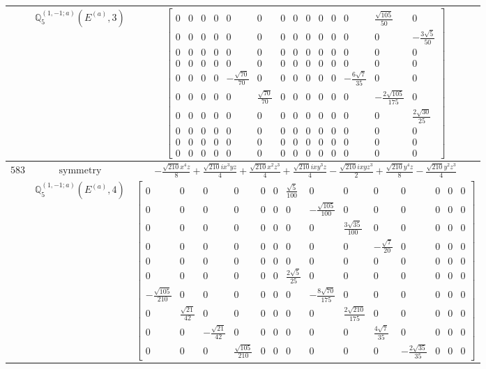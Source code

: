 \documentclass[fleqn,8pt,landscape]{jsarticle}
\begin{document}
\begin{longtable}{ccc}
$  $ & $ \mathbb{Q}_{5}^{(1,-1;a)}(E^{(a)},3) $ & $ \begin{bmatrix} 0 & 0 & 0 & 0 & 0 & 0 & 0 & 0 & 0 & 0 & 0 & 0 & \frac{\sqrt{105}}{50} & 0 \\ 0 & 0 & 0 & 0 & 0 & 0 & 0 & 0 & 0 & 0 & 0 & 0 & 0 & - \frac{3 \sqrt{5}}{50} \\ 0 & 0 & 0 & 0 & 0 & 0 & 0 & 0 & 0 & 0 & 0 & 0 & 0 & 0 \\ 0 & 0 & 0 & 0 & 0 & 0 & 0 & 0 & 0 & 0 & 0 & 0 & 0 & 0 \\ 0 & 0 & 0 & 0 & - \frac{\sqrt{70}}{70} & 0 & 0 & 0 & 0 & 0 & 0 & - \frac{6 \sqrt{7}}{35} & 0 & 0 \\ 0 & 0 & 0 & 0 & 0 & \frac{\sqrt{70}}{70} & 0 & 0 & 0 & 0 & 0 & 0 & - \frac{2 \sqrt{105}}{175} & 0 \\ 0 & 0 & 0 & 0 & 0 & 0 & 0 & 0 & 0 & 0 & 0 & 0 & 0 & \frac{2 \sqrt{30}}{25} \\ 0 & 0 & 0 & 0 & 0 & 0 & 0 & 0 & 0 & 0 & 0 & 0 & 0 & 0 \\ 0 & 0 & 0 & 0 & 0 & 0 & 0 & 0 & 0 & 0 & 0 & 0 & 0 & 0 \\ 0 & 0 & 0 & 0 & 0 & 0 & 0 & 0 & 0 & 0 & 0 & 0 & 0 & 0 \end{bmatrix} $ \\ \hline
$ 583 $ & $ \text{symmetry} $ & $ - \frac{\sqrt{210} x^{4} z}{8} + \frac{\sqrt{210} i x^{3} y z}{4} + \frac{\sqrt{210} x^{2} z^{3}}{4} + \frac{\sqrt{210} i x y^{3} z}{4} - \frac{\sqrt{210} i x y z^{3}}{2} + \frac{\sqrt{210} y^{4} z}{8} - \frac{\sqrt{210} y^{2} z^{3}}{4} $ \\
$  $ & $ \mathbb{Q}_{5}^{(1,-1;a)}(E^{(a)},4) $ & $ \begin{bmatrix} 0 & 0 & 0 & 0 & 0 & 0 & \frac{\sqrt{5}}{100} & 0 & 0 & 0 & 0 & 0 & 0 & 0 \\ 0 & 0 & 0 & 0 & 0 & 0 & 0 & - \frac{\sqrt{105}}{100} & 0 & 0 & 0 & 0 & 0 & 0 \\ 0 & 0 & 0 & 0 & 0 & 0 & 0 & 0 & \frac{3 \sqrt{35}}{100} & 0 & 0 & 0 & 0 & 0 \\ 0 & 0 & 0 & 0 & 0 & 0 & 0 & 0 & 0 & - \frac{\sqrt{7}}{20} & 0 & 0 & 0 & 0 \\ 0 & 0 & 0 & 0 & 0 & 0 & 0 & 0 & 0 & 0 & 0 & 0 & 0 & 0 \\ 0 & 0 & 0 & 0 & 0 & 0 & \frac{2 \sqrt{5}}{25} & 0 & 0 & 0 & 0 & 0 & 0 & 0 \\ - \frac{\sqrt{105}}{210} & 0 & 0 & 0 & 0 & 0 & 0 & - \frac{8 \sqrt{70}}{175} & 0 & 0 & 0 & 0 & 0 & 0 \\ 0 & \frac{\sqrt{21}}{42} & 0 & 0 & 0 & 0 & 0 & 0 & \frac{2 \sqrt{210}}{175} & 0 & 0 & 0 & 0 & 0 \\ 0 & 0 & - \frac{\sqrt{21}}{42} & 0 & 0 & 0 & 0 & 0 & 0 & \frac{4 \sqrt{7}}{35} & 0 & 0 & 0 & 0 \\ 0 & 0 & 0 & \frac{\sqrt{105}}{210} & 0 & 0 & 0 & 0 & 0 & 0 & - \frac{2 \sqrt{35}}{35} & 0 & 0 & 0 \end{bmatrix} $ \\ \hline

\end{longtable}
\end{document}
